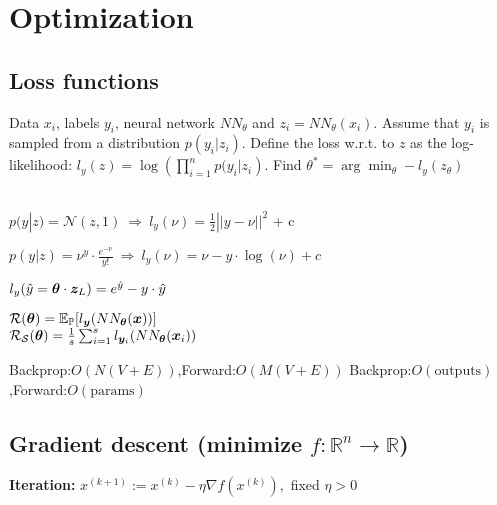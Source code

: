 \section{Optimization}
\subsection*{Loss functions} Data $x_i$, labels $y_i$, neural network $NN_\theta$ and $z_i = NN_\theta(x_i)$. Assume that $y_i$ is sampled from a distribution $p(y_i | z_i)$. Define the loss w.r.t. to $z$ as the log-likelihood: $l_y(z) = \log\left(\prod_{i=1}^n p(y_i | z_i\right)$. Find $\theta^* = \arg\min_\theta -l_y(z_\theta)$\\
\\
\begin{inparaitem}[$\color{mygreen} \triangleright$]
\item $p(y|z) = \mathcal{N}(z,1)\ \Rightarrow\ l_y(\nu) = \frac{1}{2}||y - \nu||^2$ + c\\
\item $p(y|z) = \nu^y \cdot \frac{e^{-\nu}}{y!}\ \Rightarrow\ l_y(\nu) = \nu - y \cdot \log(\nu) + c$\\
\end{inparaitem}

 $l_y(\hat{y}=\boldsymbol{\theta}\cdot\boldsymbol{z}_{L})=e^{\hat{y}}-y\cdot\hat{y}$

 $\mathcal{R}(\boldsymbol{\theta}) = \mathbb{E}_{\mathbb{P}}[l_{\boldsymbol{y}}(NN_{\boldsymbol{\theta}}(\boldsymbol{x}))]$\\  $\mathcal{R_S}(\boldsymbol{\theta}) = \frac{1}{s}\sum_{i=1}^s l_{\boldsymbol{y}_i}(NN_{\boldsymbol{\theta}}(\boldsymbol{x}_i))$

Backprop:$O(N(V+E))$,Forward:$O(M(V+E))$
Backprop:$O(\text{outputs})$,Forward:$O(\text{params})$

\subsection*{Gradient descent (minimize $f:\mathbb{R}^n \rightarrow \mathbb{R}$)}
\textbf{Iteration:} $x^{(k+1)} := x^{(k)} - \eta \nabla f(x^{(k)}),$ fixed $\eta>0$
